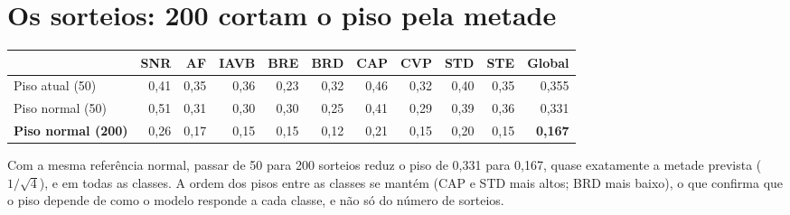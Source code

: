\documentclass[11pt,a4paper]{article}
\begin{document}
\section{Os sorteios: 200 cortam o piso pela metade}
\begin{center}\small
\begin{tabular}{lrrrrrrrrrr}
\toprule
& \textbf{SNR} & \textbf{AF} & \textbf{IAVB} & \textbf{BRE} & \textbf{BRD} & \textbf{CAP} & \textbf{CVP} & \textbf{STD} & \textbf{STE} & \textbf{Global} \\
\midrule
Piso atual (50) & 0,41 & 0,35 & 0,36 & 0,23 & 0,32 & 0,46 & 0,32 & 0,40 & 0,35 & 0,355 \\
Piso normal (50) & 0,51 & 0,31 & 0,30 & 0,30 & 0,25 & 0,41 & 0,29 & 0,39 & 0,36 & 0,331 \\
\textbf{Piso normal (200)} & 0,26 & 0,17 & 0,15 & 0,15 & 0,12 & 0,21 & 0,15 & 0,20 & 0,15 & \textbf{0,167} \\
\bottomrule
\end{tabular}
\end{center}
Com a mesma referência normal, passar de 50 para 200 sorteios reduz o piso de 0,331 para 0,167, quase exatamente a metade prevista ($1/\sqrt{4}$), e em todas as classes. A ordem dos pisos entre as classes se mantém (CAP e STD mais altos; BRD mais baixo), o que confirma que o piso depende de como o modelo responde a cada classe, e não só do número de sorteios.
\end{document}
